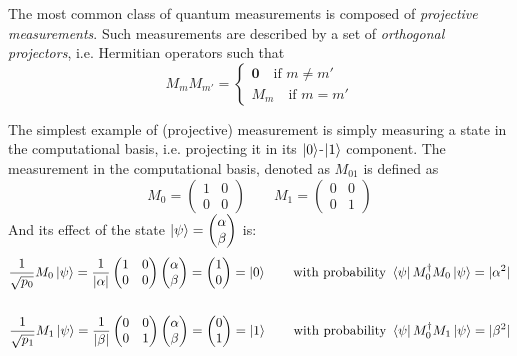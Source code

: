 The most common class of quantum measurements is composed of \textit{projective measurements}. Such measurements are described by a set of \textit{orthogonal projectors}, i.e. Hermitian operators such that \[ M_mM_{m'} = \begin{cases}\mathbf{0}\quad\text{if } m \neq m' \\ M_m\quad\text{if }m = m'\end{cases}\]


The simplest example of (projective) measurement is simply measuring a state in the computational basis, i.e. projecting it in its $\ket{0}$-$\ket{1}$ component. The measurement in the computational basis, denoted as $M_{01}$ is defined as \[ M_0 = \begin{pmatrix} 1 & 0 \\ 0 & 0\end{pmatrix} \qquad
M_1 = \begin{pmatrix}0 & 0 \\ 0 & 1\end{pmatrix} \]
And its effect of the state $\ket{\psi} = \begin{pmatrix}\alpha \\ \beta \end{pmatrix}$ is:
\begin{align*}
\frac{1}{\sqrt{p_0}}M_0\ket{\psi} = \frac{1}{|\alpha|}\begin{pmatrix} 1 & 0 \\ 0 & 0\end{pmatrix}
\begin{pmatrix}\alpha \\ \beta \end{pmatrix} = \begin{pmatrix} 1 \\ 0 \end{pmatrix} = \ket{0} 
\qquad \text{with probability } \bra{\psi}M_0^\dagger M_0\ket{\psi} = |\alpha^2| \\
\\
\frac{1}{\sqrt{p_1}}M_1\ket{\psi} = \frac{1}{|\beta|}\begin{pmatrix} 0 & 0 \\ 0 & 1\end{pmatrix}
\begin{pmatrix}\alpha \\ \beta \end{pmatrix} = \begin{pmatrix} 0 \\ 1 \end{pmatrix} = \ket{1} 
\qquad \text{with probability } \bra{\psi}M_0^\dagger M_1\ket{\psi} = |\beta^2|
\end{align*}

